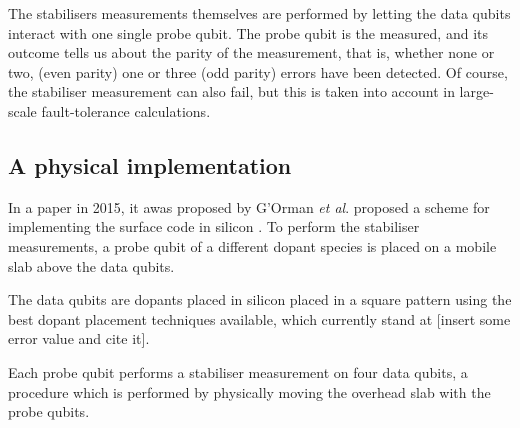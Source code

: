 The stabilisers measurements themselves are performed by letting the data qubits interact with one single probe qubit. The probe qubit is the measured, and its outcome tells us about the parity of the measurement, that is, whether none or two,  (even parity) one  or three (odd parity) errors have been detected. Of course, the stabiliser measurement can also fail, but this is taken into account in large-scale fault-tolerance calculations. 




\subsection{A physical implementation} \label{sec:PhysicalImplementation}
In a paper in 2015, it awas proposed by G'Orman \textit{et al}. proposed a scheme for implementing the surface code in silicon \cite{the paper}.  To perform the stabiliser measurements, a probe qubit of a different dopant species is placed on a mobile slab above the data qubits. 


The data qubits are dopants placed in silicon placed in a square pattern using the best dopant placement techniques available, which currently stand at [insert some error value and cite it].

Each probe qubit performs a stabiliser measurement on four data qubits, a procedure which is performed by physically moving the overhead slab with the probe qubits. 



\begin{figure}[H]
	\centering
	\\
	\caption[oddeven]{}
	\label{FIG:paper}
\end{figure}


